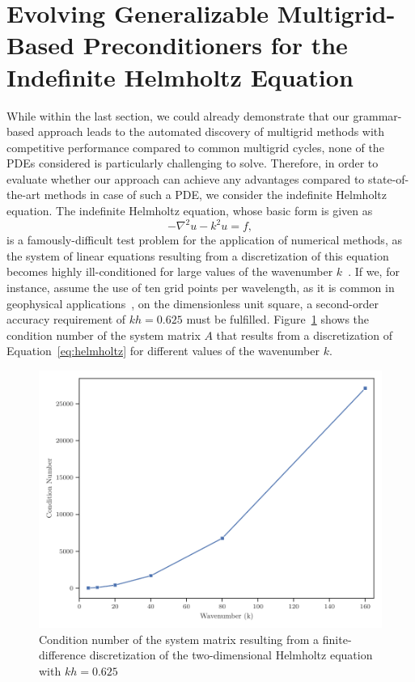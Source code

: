 \section{Evolving Generalizable Multigrid-Based Preconditioners for the Indefinite Helmholtz Equation}
While within the last section, we could already demonstrate that our grammar-based approach leads to the automated discovery of multigrid methods with competitive performance compared to common multigrid cycles, none of the PDEs considered is particularly challenging to solve.   
Therefore, in order to evaluate whether our approach can achieve any advantages compared to state-of-the-art methods in case of such a PDE, we consider the indefinite Helmholtz equation.
The indefinite Helmholtz equation, whose basic form is given as 
\begin{equation}
	-\nabla ^{2}u - k^{2}u = f,
	\label{eq:helmholtz}
\end{equation} 
is a famously-difficult test problem for the application of numerical methods, as the system of linear equations resulting from a discretization of this equation becomes highly ill-conditioned for large values of the wavenumber $k$~\cite{ernst2012difficult}.
If we, for instance, assume the use of ten grid points per wavelength, as it is common in geophysical applications~\cite{erlangga2006multigrid}, on the dimensionless unit square, a second-order accuracy requirement of $kh = 0.625$ must be fulfilled.
Figure~\ref{fig:condition-number-helmholtz} shows the condition number of the system matrix $A$ that results from a discretization of Equation~\eqref{eq:helmholtz} for different values of the wavenumber $k$.
\begin{figure}
		\centering
		\includegraphics[width=\textwidth]{figures/cond.pdf}
		\caption{Condition number of the system matrix resulting from a finite-difference discretization of the two-dimensional Helmholtz equation with $kh = 0.625$}
		\label{fig:condition-number-helmholtz}
\end{figure}
